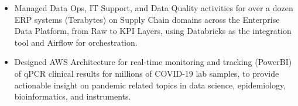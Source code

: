 \documentclass[10pt,a4paper]{altacv}
\begin{document}
\tagline{}

%

\begin{fullwidth}
\makecvheader
\end{fullwidth}

%





\begin{itemize}
    \item   \small{Managed Data Ops, IT Support, and Data Quality activities for over a dozen ERP systems (Terabytes) on Supply Chain domains across the Enterprise Data Platform, from Raw to KPI Layers, using Databricks as the integration tool and Airflow for orchestration.}
    \item   \small{Designed AWS Architecture for real-time monitoring and tracking (PowerBI) of qPCR clinical results for millions of COVID-19 lab samples, to provide actionable insight on pandemic related topics in data science, epidemiology, bioinformatics, and instruments.}
\end{itemize}
\end{document}
